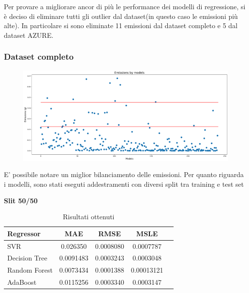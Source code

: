 Per provare a migliorare ancor di più le performance dei modelli di regressione, si è deciso di eliminare tutti gli outlier dal dataset(in questo caso le emissioni più alte). In particolare si sono eliminate 11 emissioni dal dataset completo e 5 dal dataset AZURE.

\subsubsection{Dataset completo}

\begin{figure}[H]
    \centering
    \includegraphics[scale=1.25]{images/nuova-situazione-ridotto.png}
\end{figure}

E' possibile notare un miglior bilanciamento delle emissioni. Per quanto riguarda i modelli, sono stati eseguti addestramenti con diversi split tra training e test set

\textbf{Slit 50/50}


\begin{table}[H]
    \centering
    \begin{tabular}{|>{\centering\arraybackslash}m{5cm}|c|c|c|c|}
        \hline
        \textbf{Regressor} & \textbf{MAE} & \textbf{RMSE} & \textbf{MSLE} \\ [10pt]
        \hline
        SVR & 0.026350 & 0.0008080 & 0.0007787 \\ [10pt]
        \hline
        Decision Tree & 0.0091483 & 0.0003243 & 0.0003048 \\ [10pt]
        \hline
        Random Forest & 0.0073434 & 0.0001388 & 0.00013121 \\ [10pt]
        \hline
        AdaBoost & 0.0115256 & 0.0003340 & 0.0003147 \\ [10pt]
        \hline
    \end{tabular}
    \caption*{Risultati ottenuti}
    \label{tab:results}
\end{table}

